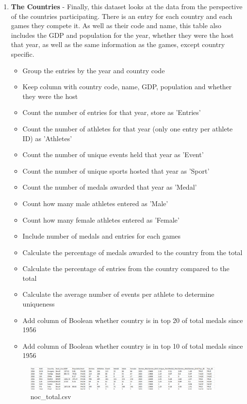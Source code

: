 \documentclass[a4 paper, 12pt]{article}
\begin{document}
\begin{enumerate}
            \item \textbf{The Countries} - Finally, this dataset looks at the data from the perspective of the countries participating. There is an entry for each country and each games they compete it. As well as their code and name, this table also includes the GDP and population for the year, whether they were the host that year, as well as the same information as the games, except country specific.
                \begin{itemize}
                    \item Group the entries by the year and country code
                    \item Keep column with country code, name, GDP, population and whether they were the host 
                    \item Count the number of entries for that year, store as 'Entries'
                    \item Count the number of athletes for that year (only one entry per athlete ID) as 'Athletes'
                    \item Count the number of unique events held that year as 'Event'
                    \item Count the number of unique sports hosted that year as 'Sport'
                    \item Count the number of medals awarded that year as 'Medal'
                    \item Count how many male athletes entered as 'Male'
                    \item Count how many female athletes entered as 'Female'
                    \item Include number of medals and entries for each games
                    \item Calculate the percentage of medals awarded to the country from the total
                    \item Calculate the percentage of entries from the country compared to the total
                    \item Calculate the average number of events per athlete to determine uniqueness
                    \item Add column of Boolean whether country is in top 20 of total medals since 1956
                    \item Add column of Boolean whether country is in top 10 of total medals since 1956
                \end{itemize}
                \begin{figure} [H]
                    \centering
                    \includegraphics[width=0.95\textwidth, frame]
                        {./images/data/noc_total.png}      
                        \caption{noc\_total.csv} 
                \end{figure}

            \end{enumerate}
\end{document}
